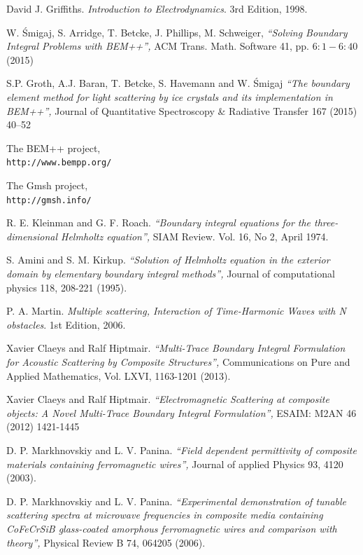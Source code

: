 \documentclass[12pt,letterpaper]{article}
\numberwithin{equation}{section}
\begin{document}
\begin{thebibliography}{9}
	David J. Griffiths. 
	\textit{Introduction to Electrodynamics}. 
	3rd Edition, 1998.
	
	W. Śmigaj, S. Arridge, T. Betcke, J. Phillips, M. Schweiger, 
	\textit{``Solving Boundary Integral Problems with BEM++'',} 
	ACM Trans. Math. Software 41, pp. $6:1-6:40$ (2015)	
	 
	S.P. Groth, A.J. Baran, T. Betcke, S. Havemann and W. Śmigaj
	\textit{``The boundary element method for light scattering by ice crystals and its implementation in BEM++'',} 
	Journal of Quantitative Spectroscopy \& Radiative Transfer 167 (2015) 40–52
		
	The BEM++ project,
	\\\texttt{http://www.bempp.org/}
	
	The Gmsh project,
	\\\texttt{http://gmsh.info/}		

	R. E. Kleinman and G. F. Roach. 
	\textit{``Boundary integral equations for the three-dimensional Helmholtz equation'',} 
	SIAM Review. Vol. 16, No 2, April 1974.
	
	S. Amini and S. M. Kirkup. 
	\textit{``Solution of Helmholtz equation in the exterior domain by elementary boundary integral methods'',} 
	Journal of computational physics 118, 208-221 (1995).	 	
	
	P. A. Martin. 
	\textit{Multiple scattering, Interaction of Time-Harmonic Waves with N obstacles}. 
	1st Edition, 2006.
	
	Xavier Claeys and Ralf Hiptmair. 
	\textit{``Multi-Trace Boundary Integral Formulation for Acoustic Scattering by Composite Structures'',} 
	Communications on Pure and Applied Mathematics, Vol. LXVI, 1163-1201 (2013).
	
	Xavier Claeys and Ralf Hiptmair. 
	\textit{``Electromagnetic Scattering at composite objects: A Novel Multi-Trace Boundary Integral Formulation'',} 
	ESAIM: M2AN 46 (2012) 1421-1445
	
	D. P. Markhnovskiy and L. V. Panina.
	\textit{``Field dependent permittivity of composite materials containing ferromagnetic wires'',} 
	Journal of applied Physics 93, 4120 (2003).
	
	D. P. Markhnovskiy and L. V. Panina.
	\textit{``Experimental demonstration of tunable scattering spectra at microwave frequencies in composite media containing CoFeCrSiB glass-coated amorphous ferromagnetic wires and comparison with theory'',} 
	Physical Review B 74, 064205 (2006).
	

\end{thebibliography}
\end{document}
